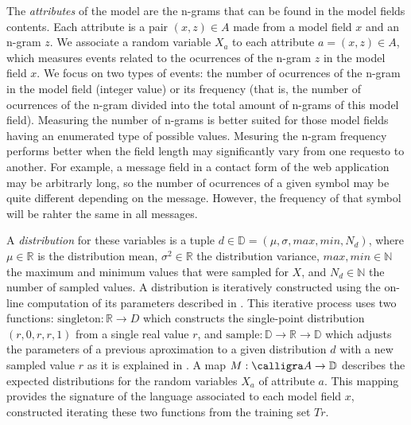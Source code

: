 \documentclass[runningheads,a4paper]{llncs}
\newcommand{\R}{\mathbb{R}}
\newcommand{\D}{\mathbb{D}}
\newcommand{\A}{\calligra A}
\newcommand{\N}{\mathbb{N}}
\newcommand{\HTTP}{\textsc{http}\xspace}
\begin{document}
The \textit{attributes} of the model are the n-grams that can be found in the model fields contents. Each attribute is a pair $(x,z) \in A$ made from a model field $x$ and an n-gram $z$. We associate a random variable $X_a$ to each attribute $a=(x,z) \in A$, which measures events related to the ocurrences of the n-gram $z$ in the model field $x$. We focus on two types of events: the number of ocurrences of the n-gram in the model field (integer value) or its frequency (that is, the number of ocurrences of the n-gram divided into the total amount of n-grams of this model field). Measuring the number of n-grams is better suited for those model fields having an enumerated type of possible values. Mesuring the n-gram frequency performs better when the field length may significantly vary from one requesto to another. For example, a message field in a contact form of the web application may be arbitrarly long, so the number of ocurrences of a given symbol may be quite different depending on the message. However, the frequency of that symbol will be rahter the same in all messages.


A \textit{distribution} for these variables is a tuple $d \in \D = (\mu, \sigma, max, min, N_d)$, where $\mu \in \R$ is the distribution mean, $\sigma^2 \in \R$ the distribution variance, $max,min \in \N$ the maximum and minimum values that were sampled for $X$, and $N_d\in\N$ the number of sampled values. A distribution is iteratively constructed using the on-line computation of its parameters described in \cite{Knuth}. This iterative process uses two functions: $\text{singleton} : \R \rightarrow D$ which constructs the single-point distribution $(r,0,r,r,1)$ from a single real value $r$, and $\text{sample}: \D \rightarrow \R \rightarrow \D$ which adjusts the parameters of a previous aproximation to a given distribution $d$ with a new sampled value $r$ as it is explained in \cite{Knuth}. A map $M : \A \rightarrow \D$ describes the expected distributions for the random variables $X_a$ of attribute $a$. This mapping provides the signature of the language associated to each model field $x$, constructed iterating these two functions from the training set $Tr$.
\end{document}
